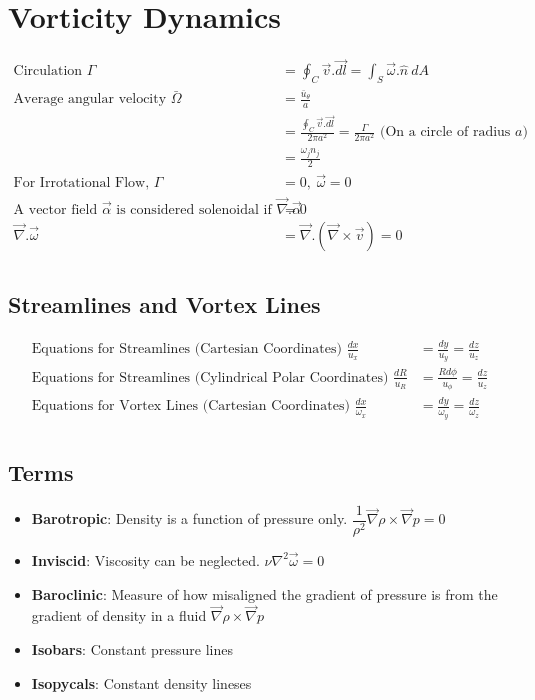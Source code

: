 \documentclass[11pt, letterpaper, notitlepage]{article}
\begin{document}
\section{Vorticity Dynamics}
\begin{align*}
\text{Circulation } \Gamma &= \oint_{C}^{} \vec{v} . \vec{dl} = \int_{S}^{} \vec{\omega}.\hat{n}\ dA \\ 
\text{Average angular velocity } \bar{\Omega} &= \frac{\bar{u}_{\theta}}{a} \\ &= \frac{\oint_{C}^{} \vec{v}.\vec{dl}}{2 \pi a^2} =  \frac{\Gamma}{2 \pi a^2} \text{ (On a circle of radius } a\text{)} \\ &= \frac{{\omega}_j n_j}{2}\\
\text{For Irrotational Flow, } \Gamma &= 0,\ \vec{\omega} = 0 \\
\text{A vector field } \vec{\alpha} \text{ is considered solenoidal if } \vec{\nabla} . \vec{\alpha} &= 0 \\
\vec{\nabla}.\vec{\omega} &= \vec{\nabla}.(\vec{\nabla} \times \vec{v}) = 0 \\
\end{align*}

\subsection{Streamlines and Vortex Lines}
\begin{align*}
\text{Equations for Streamlines (Cartesian Coordinates) } \frac{dx}{u_x} &= \frac{dy}{u_y} = \frac{dz}{u_z} \\
\text{Equations for Streamlines (Cylindrical Polar Coordinates) } \frac{dR}{u_R} &= \frac{R d \phi}{u_\phi} = \frac{dz}{u_z} \\
\text{Equations for Vortex Lines (Cartesian Coordinates) } \frac{dx}{\omega_x} &= \frac{dy}{\omega_y} = \frac{dz}{\omega_z} \\
\end{align*}

\subsection{Terms}
\begin{itemize}
\item \textbf{Barotropic}: Density is a function of pressure only. $\dfrac{1}{\rho^2} \vec{\nabla} \rho \times \vec{\nabla} p = 0$ 
\item \textbf{Inviscid}: Viscosity can be neglected. $\nu \nabla^2 \vec{\omega} = 0$ 
\item \textbf{Baroclinic}: Measure of how misaligned the gradient of pressure is from the gradient of density in a fluid $\vec{\nabla} \rho \times \vec{\nabla} p$
\item \textbf{Isobars}: Constant pressure lines
\item \textbf{Isopycals}: Constant density lineses
\end{itemize}
\end{document}
